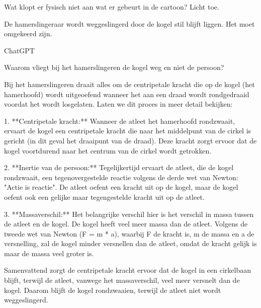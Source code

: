 


\item{}\begin{minipage}[t]{.6\linewidth}
	Wat klopt er fysisch niet aan wat er gebeurt in de cartoon? Licht toe.
\end{minipage}
\hfill
\begin{minipage}[t]{.37\linewidth}
\end{minipage}


\begin{oplossing}

De hamerslingeraar wordt weggeslingerd door de kogel stil blijft liggen. Het moet omgekeerd zijn.




ChatGPT

Waarom vliegt bij het hamerslingeren de kogel weg en niet de persoon?

Bij het hamerslingeren draait alles om de centripetale kracht die op de kogel (het hamerhoofd) wordt uitgeoefend wanneer het aan een draad wordt rondgedraaid voordat het wordt losgelaten. Laten we dit proces in meer detail bekijken:

1. **Centripetale kracht:** Wanneer de atleet het hamerhoofd rondzwaait, ervaart de kogel een centripetale kracht die naar het middelpunt van de cirkel is gericht (in dit geval het draaipunt van de draad). Deze kracht zorgt ervoor dat de kogel voortdurend naar het centrum van de cirkel wordt getrokken.

2. **Inertie van de persoon:** Tegelijkertijd ervaart de atleet, die de kogel rondzwaait, een tegenovergestelde reactie volgens de derde wet van Newton: "Actie is reactie". De atleet oefent een kracht uit op de kogel, maar de kogel oefent ook een gelijke maar tegengestelde kracht uit op de atleet.

3. **Massaverschil:** Het belangrijke verschil hier is het verschil in massa tussen de atleet en de kogel. De kogel heeft veel meer massa dan de atleet. Volgens de tweede wet van Newton (F = m * a), waarbij F de kracht is, m de massa en a de versnelling, zal de kogel minder versnellen dan de atleet, omdat de kracht gelijk is maar de massa veel groter is.

Samenvattend zorgt de centripetale kracht ervoor dat de kogel in een cirkelbaan blijft, terwijl de atleet, vanwege het massaverschil, veel meer versnelt dan de kogel. Daarom blijft de kogel rondzwaaien, terwijl de atleet niet wordt weggeslingerd.

\end{oplossing}